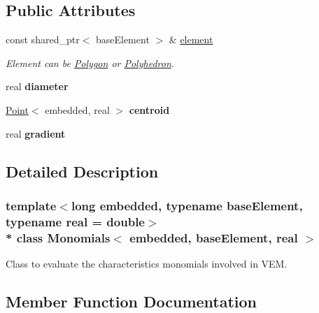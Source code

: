 \subsection*{Public Attributes}
\begin{DoxyCompactItemize}
\item 
const shared\+\_\+ptr$<$ base\+Element $>$ \& \hyperlink{class_monomials_a6e5a84ffd4592bb8f0562cfe96c6f463}{element}\hypertarget{class_monomials_a6e5a84ffd4592bb8f0562cfe96c6f463}{}\label{class_monomials_a6e5a84ffd4592bb8f0562cfe96c6f463}

\begin{DoxyCompactList}\small\item\em Element can be \hyperlink{class_polygon}{Polygon} or \hyperlink{class_polyhedron}{Polyhedron}. \end{DoxyCompactList}\item 
real {\bfseries diameter}\hypertarget{class_monomials_ab425c9bddc36c5a049d2b115b57fd8eb}{}\label{class_monomials_ab425c9bddc36c5a049d2b115b57fd8eb}

\item 
\hyperlink{class_point}{Point}$<$ embedded, real $>$ {\bfseries centroid}\hypertarget{class_monomials_af171e16a3bcdde2d4a35f5e1d3640b8e}{}\label{class_monomials_af171e16a3bcdde2d4a35f5e1d3640b8e}

\item 
real {\bfseries gradient}\hypertarget{class_monomials_ae02f241eae47b3a21bedbb1c6e653273}{}\label{class_monomials_ae02f241eae47b3a21bedbb1c6e653273}

\end{DoxyCompactItemize}


\subsection{Detailed Description}
\subsubsection*{template$<$long embedded, typename base\+Element, typename real = double$>$\\*
class Monomials$<$ embedded, base\+Element, real $>$}

Class to evaluate the characteristics monomials involved in V\+EM. 

\subsection{Member Function Documentation}
